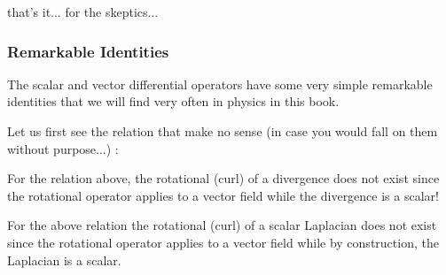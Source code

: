 	that's it... for the skeptics...
	
	\subsubsection{Remarkable Identities}\label{differential operators identities}
	The scalar and vector differential operators have some very simple remarkable identities that we will find very often in physics in this book.
	
	Let us first see the relation that make no sense (in case you would fall on them without purpose...) :
	
	For the relation above, the rotational (curl) of a divergence does not exist since the rotational operator applies to a vector field while the divergence is a scalar!
	
	For the above relation the rotational (curl) of a scalar Laplacian does not exist since the rotational operator applies to a vector field while by construction, the Laplacian is a scalar.
	
